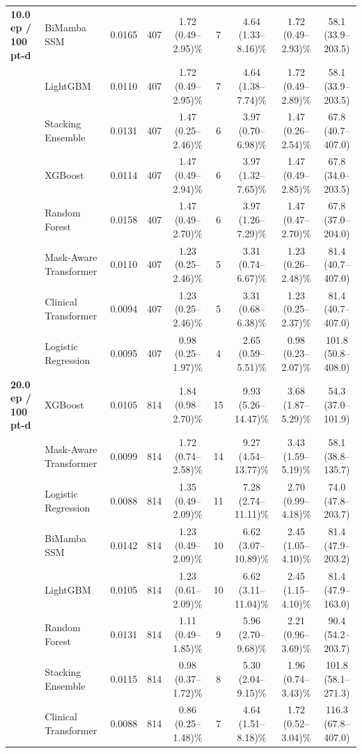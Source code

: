 \documentclass[12pt,a4paper]{article}
\begin{document}
\begin{landscape}
\begin{table}[p]
\begin{singlespace}
\begin{tabular*}{\linewidth}{@{\extracolsep{\fill}}llccccccc}
\midrule
\textbf{10.0 ep / 100 pt-d} & BiMamba SSM & 0.0165 & 407 & 1.72 (0.49--2.95)\% & 7 & 4.64 (1.33--8.16)\% & 1.72 (0.49--2.93)\% & 58.1 (33.9--203.5) \\
 & LightGBM & 0.0110 & 407 & 1.72 (0.49--2.95)\% & 7 & 4.64 (1.38--7.74)\% & 1.72 (0.49--2.89)\% & 58.1 (33.9--203.5) \\
 & Stacking Ensemble & 0.0131 & 407 & 1.47 (0.25--2.46)\% & 6 & 3.97 (0.70--6.98)\% & 1.47 (0.26--2.54)\% & 67.8 (40.7--407.0) \\
 & XGBoost & 0.0114 & 407 & 1.47 (0.49--2.94)\% & 6 & 3.97 (1.32--7.65)\% & 1.47 (0.49--2.85)\% & 67.8 (34.0--203.5) \\
 & Random Forest & 0.0158 & 407 & 1.47 (0.49--2.70)\% & 6 & 3.97 (1.26--7.29)\% & 1.47 (0.47--2.70)\% & 67.8 (37.0--204.0) \\
 & Mask-Aware Transformer & 0.0110 & 407 & 1.23 (0.25--2.46)\% & 5 & 3.31 (0.74--6.67)\% & 1.23 (0.26--2.48)\% & 81.4 (40.7--407.0) \\
 & Clinical Transformer & 0.0094 & 407 & 1.23 (0.25--2.46)\% & 5 & 3.31 (0.68--6.38)\% & 1.23 (0.25--2.37)\% & 81.4 (40.7--407.0) \\
 & Logistic Regression & 0.0095 & 407 & 0.98 (0.25--1.97)\% & 4 & 2.65 (0.59--5.51)\% & 0.98 (0.23--2.07)\% & 101.8 (50.8--408.0) \\
\midrule
\textbf{20.0 ep / 100 pt-d} & XGBoost & 0.0105 & 814 & 1.84 (0.98--2.70)\% & 15 & 9.93 (5.26--14.47)\% & 3.68 (1.87--5.29)\% & 54.3 (37.0--101.9) \\
 & Mask-Aware Transformer & 0.0099 & 814 & 1.72 (0.74--2.58)\% & 14 & 9.27 (4.54--13.77)\% & 3.43 (1.59--5.19)\% & 58.1 (38.8--135.7) \\
 & Logistic Regression & 0.0088 & 814 & 1.35 (0.49--2.09)\% & 11 & 7.28 (2.74--11.11)\% & 2.70 (0.99--4.18)\% & 74.0 (47.8--203.7) \\
 & BiMamba SSM & 0.0142 & 814 & 1.23 (0.49--2.09)\% & 10 & 6.62 (3.07--10.89)\% & 2.45 (1.05--4.10)\% & 81.4 (47.9--203.2) \\
 & LightGBM & 0.0105 & 814 & 1.23 (0.61--2.09)\% & 10 & 6.62 (3.11--11.04)\% & 2.45 (1.15--4.10)\% & 81.4 (47.9--163.0) \\
 & Random Forest & 0.0131 & 814 & 1.11 (0.49--1.85)\% & 9 & 5.96 (2.70--9.68)\% & 2.21 (0.96--3.69)\% & 90.4 (54.2--203.7) \\
 & Stacking Ensemble & 0.0115 & 814 & 0.98 (0.37--1.72)\% & 8 & 5.30 (2.04--9.15)\% & 1.96 (0.74--3.43)\% & 101.8 (58.1--271.3) \\
 & Clinical Transformer & 0.0088 & 814 & 0.86 (0.25--1.48)\% & 7 & 4.64 (1.51--8.18)\% & 1.72 (0.52--3.04)\% & 116.3 (67.8--407.0) \\

\end{tabular*}
\end{singlespace}
\end{table}
\end{landscape}
\end{document}
